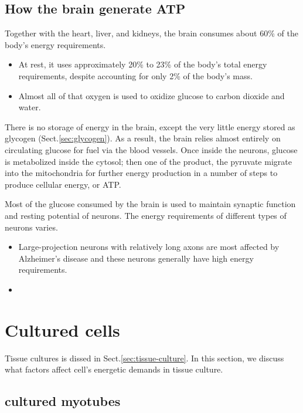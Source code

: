  
\subsection{How the brain generate ATP}

Together with the heart, liver, and kidneys, the brain consumes about 60\% of
the body's energy requirements.
\begin{itemize}
  \item  At rest, it uses approximately 20\% to 23\% of the body's total energy
  requirements, despite accounting for only 2\% of the body's mass.
  
  \item Almost all of that oxygen is used to oxidize glucose to carbon dioxide
  and water.
\end{itemize}

There is no storage of energy in the brain, except the very little energy stored
as glycogen (Sect.\ref{sec:glycogen}). As a result, the brain relies almost
entirely on circulating glucose for fuel via the blood vessels. Once inside the
neurons, glucose is metabolized inside the cytosol; then one of the product, the
pyruvate migrate into the mitochondria for further energy production in a number
of steps to produce cellular energy, or ATP.

Most of the glucose consumed by the brain is used to maintain synaptic function
and resting potential of neurons. The energy requirements of different types of
neurons varies.
\begin{itemize}
  \item  Large-projection neurons with relatively long axons are most affected
  by Alzheimer's disease and these neurons generally have high energy requirements.
  
  \item 
\end{itemize}



\section{Cultured cells}
\label{sec:tissue-culture-energetic-demand}

Tissue cultures is dissed in Sect.\ref{sec:tissue-culture}.
In this section, we discuss what factors affect cell's energetic demands in
tissue culture.

\subsection{cultured myotubes}

